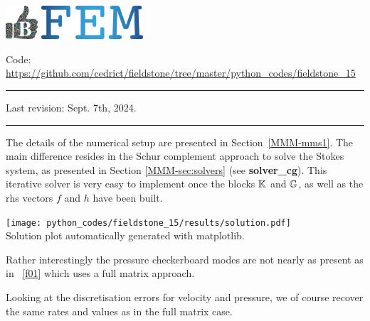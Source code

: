 \includegraphics[height=1.25cm]{images/pictograms/benchmark}
\includegraphics[height=1.25cm]{images/pictograms/FEM}




\begin{center}
\inpython
{\small Code: \url{https://github.com/cedrict/fieldstone/tree/master/python_codes/fieldstone_15}}
\end{center}

\par\noindent\rule{\textwidth}{0.4pt}

Last revision: Sept. 7th, 2024.

\par\noindent\rule{\textwidth}{0.4pt}

The details of the numerical setup are presented in Section~\ref{MMM-mms1}.
The main difference resides in the Schur complement approach to solve the 
Stokes system, as presented in Section \ref{MMM-sec:solvers} (see {\bf solver\_cg}).
This iterative solver is very easy to implement once the blocks ${\mathbb{K}}$ and ${\mathbb{G}}$, 
as well as the rhs vectors $f$ and $h$ have been built. 

\begin{center}
\texttt{[image: python\_codes/fieldstone\_15/results/solution.pdf]}\\
{\captionfont Solution plot automatically generated with matplotlib.}
\end{center}

Rather interestingly the pressure checkerboard modes are not nearly as present as 
in \stone~\ref{f01} which uses a full matrix approach. 

Looking at the discretisation errors for velocity and pressure, we 
of course recover the same rates and values as in the full matrix case.

